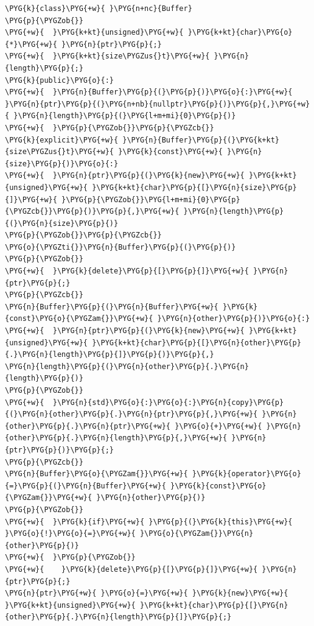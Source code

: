 \begin{codeblockbg}
\begin{Verbatim}[commandchars=\\\{\},breaklines=true,breakanywhere=true,fontsize=\codefont,xleftmargin=17bp]
\PYG{k}{class}\PYG{+w}{ }\PYG{n+nc}{Buffer}
\PYG{p}{\PYGZob{}}
\PYG{+w}{  }\PYG{k+kt}{unsigned}\PYG{+w}{ }\PYG{k+kt}{char}\PYG{o}{*}\PYG{+w}{ }\PYG{n}{ptr}\PYG{p}{;}
\PYG{+w}{  }\PYG{k+kt}{size\PYGZus{}t}\PYG{+w}{ }\PYG{n}{length}\PYG{p}{;}
\PYG{k}{public}\PYG{o}{:}
\PYG{+w}{  }\PYG{n}{Buffer}\PYG{p}{(}\PYG{p}{)}\PYG{o}{:}\PYG{+w}{ }\PYG{n}{ptr}\PYG{p}{(}\PYG{n+nb}{nullptr}\PYG{p}{)}\PYG{p}{,}\PYG{+w}{ }\PYG{n}{length}\PYG{p}{(}\PYG{l+m+mi}{0}\PYG{p}{)}
\PYG{+w}{  }\PYG{p}{\PYGZob{}}\PYG{p}{\PYGZcb{}}
\PYG{k}{explicit}\PYG{+w}{ }\PYG{n}{Buffer}\PYG{p}{(}\PYG{k+kt}{size\PYGZus{}t}\PYG{+w}{ }\PYG{k}{const}\PYG{+w}{ }\PYG{n}{size}\PYG{p}{)}\PYG{o}{:}
\PYG{+w}{  }\PYG{n}{ptr}\PYG{p}{(}\PYG{k}{new}\PYG{+w}{ }\PYG{k+kt}{unsigned}\PYG{+w}{ }\PYG{k+kt}{char}\PYG{p}{[}\PYG{n}{size}\PYG{p}{]}\PYG{+w}{ }\PYG{p}{\PYGZob{}}\PYG{l+m+mi}{0}\PYG{p}{\PYGZcb{}}\PYG{p}{)}\PYG{p}{,}\PYG{+w}{ }\PYG{n}{length}\PYG{p}{(}\PYG{n}{size}\PYG{p}{)}
\PYG{p}{\PYGZob{}}\PYG{p}{\PYGZcb{}}
\PYG{o}{\PYGZti{}}\PYG{n}{Buffer}\PYG{p}{(}\PYG{p}{)}
\PYG{p}{\PYGZob{}}
\PYG{+w}{  }\PYG{k}{delete}\PYG{p}{[}\PYG{p}{]}\PYG{+w}{ }\PYG{n}{ptr}\PYG{p}{;}
\PYG{p}{\PYGZcb{}}
\PYG{n}{Buffer}\PYG{p}{(}\PYG{n}{Buffer}\PYG{+w}{ }\PYG{k}{const}\PYG{o}{\PYGZam{}}\PYG{+w}{ }\PYG{n}{other}\PYG{p}{)}\PYG{o}{:}
\PYG{+w}{  }\PYG{n}{ptr}\PYG{p}{(}\PYG{k}{new}\PYG{+w}{ }\PYG{k+kt}{unsigned}\PYG{+w}{ }\PYG{k+kt}{char}\PYG{p}{[}\PYG{n}{other}\PYG{p}{.}\PYG{n}{length}\PYG{p}{]}\PYG{p}{)}\PYG{p}{,}
\PYG{n}{length}\PYG{p}{(}\PYG{n}{other}\PYG{p}{.}\PYG{n}{length}\PYG{p}{)}
\PYG{p}{\PYGZob{}}
\PYG{+w}{  }\PYG{n}{std}\PYG{o}{:}\PYG{o}{:}\PYG{n}{copy}\PYG{p}{(}\PYG{n}{other}\PYG{p}{.}\PYG{n}{ptr}\PYG{p}{,}\PYG{+w}{ }\PYG{n}{other}\PYG{p}{.}\PYG{n}{ptr}\PYG{+w}{ }\PYG{o}{+}\PYG{+w}{ }\PYG{n}{other}\PYG{p}{.}\PYG{n}{length}\PYG{p}{,}\PYG{+w}{ }\PYG{n}{ptr}\PYG{p}{)}\PYG{p}{;}
\PYG{p}{\PYGZcb{}}
\PYG{n}{Buffer}\PYG{o}{\PYGZam{}}\PYG{+w}{ }\PYG{k}{operator}\PYG{o}{=}\PYG{p}{(}\PYG{n}{Buffer}\PYG{+w}{ }\PYG{k}{const}\PYG{o}{\PYGZam{}}\PYG{+w}{ }\PYG{n}{other}\PYG{p}{)}
\PYG{p}{\PYGZob{}}
\PYG{+w}{  }\PYG{k}{if}\PYG{+w}{ }\PYG{p}{(}\PYG{k}{this}\PYG{+w}{ }\PYG{o}{!}\PYG{o}{=}\PYG{+w}{ }\PYG{o}{\PYGZam{}}\PYG{n}{other}\PYG{p}{)}
\PYG{+w}{  }\PYG{p}{\PYGZob{}}
\PYG{+w}{    }\PYG{k}{delete}\PYG{p}{[}\PYG{p}{]}\PYG{+w}{ }\PYG{n}{ptr}\PYG{p}{;}
\PYG{n}{ptr}\PYG{+w}{ }\PYG{o}{=}\PYG{+w}{ }\PYG{k}{new}\PYG{+w}{ }\PYG{k+kt}{unsigned}\PYG{+w}{ }\PYG{k+kt}{char}\PYG{p}{[}\PYG{n}{other}\PYG{p}{.}\PYG{n}{length}\PYG{p}{]}\PYG{p}{;}

\end{Verbatim}
\end{codeblockbg}

